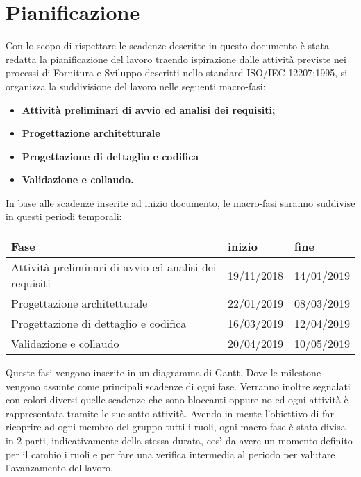 \section{Pianificazione}

Con lo scopo di rispettare le scadenze descritte in questo documento è stata redatta la pianificazione del lavoro traendo ispirazione dalle attività previste nei processi di Fornitura e Sviluppo descritti nello standard ISO/IEC 12207:1995, si organizza la suddivisione del lavoro nelle seguenti macro-fasi:
\begin{itemize}
	\item{\textbf{Attività preliminari di avvio ed analisi dei requisiti;}}
	\item{\textbf{Progettazione architetturale}}
	\item{\textbf{Progettazione di dettaglio e codifica}}
	\item{\textbf{Validazione e collaudo.}}
\end{itemize} 
In base alle scadenze inserite ad inizio documento, le macro-fasi saranno suddivise in questi periodi temporali:
\newline
\begin{tabular}{|l|l|l|}
	\hline
	\textbf{Fase} & \textbf{inizio} & \textbf{fine}\\
	\hline
	Attività preliminari di avvio ed analisi dei requisiti & 19/11/2018 & 14/01/2019 \\
	\hline
	Progettazione architetturale & 22/01/2019 & 08/03/2019\\
	\hline
	Progettazione di dettaglio e codifica & 16/03/2019 & 12/04/2019\\
	\hline
	Validazione e collaudo & 20/04/2019 & 10/05/2019\\
	\hline
\end{tabular}
\newline
Queste fasi vengono inserite in un diagramma di Gantt. Dove le milestone vengono assunte come principali scadenze di ogni fase. Verranno inoltre segnalati con colori diversi quelle scadenze che sono bloccanti oppure no ed  ogni attività è rappresentata tramite le sue sotto attività.
\newline Avendo in mente l'obiettivo di far ricoprire ad ogni membro del gruppo tutti i ruoli, ogni macro-fase è stata divisa in 2 parti, indicativamente della stessa durata, così da avere un momento definito per il cambio i ruoli e per fare una verifica intermedia al periodo per valutare l'avanzamento del lavoro. 

